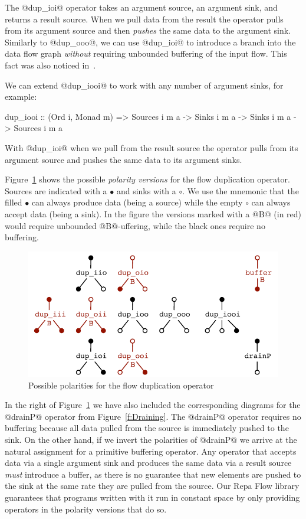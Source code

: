 The @dup_ioi@ operator takes an argument source, an argument sink, and returns a result source. When we pull data from the result the operator pulls from its argument source and then \emph{pushes} the same data to the argument sink. Similarly to @dup_ooo@, we can use @dup_ioi@ to introduce a branch into the data flow graph \emph{without} requiring unbounded buffering of the input flow. This fact was also noticed in~\cite{Bernardy:Duality}.

\eject
We can extend @dup_iooi@ to work with any number of argument sinks, for example:
\begin{code}
 dup_iooi
  :: (Ord i, Monad m)
  => Sources i m a -> Sinks i m a -> Sinks i m a
  -> Sources i m a
\end{code}

With @dup_ioi@ when we pull from the result source the operator pulls from its argument source and pushes the same data to its argument sinks. 

Figure~\ref{f:Polarity} shows the possible \emph{polarity versions} for the flow duplication operator. Sources are indicated with a $\bullet$ and sinks with a $\circ$. We use the mnemonic that the filled $\bullet$ can always produce data (being a source) while the empty $\circ$ can always accept data (being a sink). In the figure the versions marked with a @B@ (in red) would require unbounded @B@-uffering, while the black ones require no buffering.

\begin{figure}
\includegraphics[scale=0.7]{figures/polarity.pdf}

\caption{Possible polarities for the flow duplication operator}
\label{f:Polarity}
\end{figure}

In the right of Figure~\ref{f:Polarity} we have also included the corresponding diagrams for the @drainP@ operator from Figure~\ref{f:Draining}. The @drainP@ operator requires no buffering because all data pulled from the source is immediately pushed to the sink. On the other hand, if we invert the polarities of @drainP@ we arrive at the natural assignment for a primitive buffering operator. Any operator that accepts data via a single argument sink and produces the same data via a result source \emph{must} introduce a buffer, as there is no guarantee that new elements are pushed to the sink at the same rate they are pulled from the source. Our Repa Flow library guarantees that programs written with it run in constant space by only providing operators in the polarity versions that do so.


